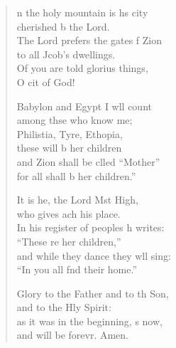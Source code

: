 \begin{verse}
  \begin{patverse}
n the holy mountain is h\pointup{\i}s city\Med\\
cherished b the Lord.\\
The Lord prefers the gates f Zion\Med\\
to all Jcob’s dwellings.\\
Of you are told glorius things,\Med\\
O cit of God!

Babylon and Egypt I w\pointup{\i}ll count\Med\\
among thse who know me;\\
Philistia, Tyre, Eth\pointup{\i}opia,\Med\\
these will b her children\\
and Zion shall be clled “Mother”\Med\\
for all shall b her children.”

It is he, the Lord Mst High,\Med\\
who gives ach his place.\\
In his register of peoples h writes:\Med\\
“These re her children,”\\
and while they dance they w\pointup{\i}ll sing:\Med\\
“In you all f\pointup{\i}nd their home.”

Glory to the Father and to th Son,\Med\\
and to the Hly Spirit:\\
as it was in the beginning, \pointup{\i}s now,\Med\\
and will be forevr. Amen.
  \end{patverse}
\end{verse}
